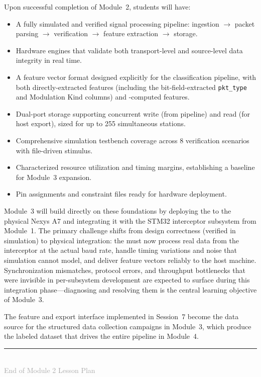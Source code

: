 \documentclass[11pt,letterpaper]{article}
\begin{document}
	Upon successful completion of Module~2, students will have:
	\begin{itemize}[leftmargin=2em]
		\item A fully simulated and verified \FPGA{} signal processing pipeline: \UART{} ingestion $\rightarrow$ packet parsing $\rightarrow$ \CRC{} verification $\rightarrow$ feature extraction $\rightarrow$ \BRAM{} storage.
		\item Hardware \CRC{} engines that validate both transport-level and source-level data integrity in real time.
		\item A feature vector format designed explicitly for the \ML{} classification pipeline, with both directly-extracted features (including the bit-field-extracted \texttt{pkt\_type} and Modulation Kind columns) and \FPGA{}-computed features.
		\item Dual-port \BRAM{} storage supporting concurrent write (from pipeline) and read (for host export), sized for up to 255 simultaneous stations.
		\item Comprehensive simulation testbench coverage across 8 verification scenarios with file-driven stimulus.
		\item Characterized resource utilization and timing margins, establishing a baseline for Module~3 expansion.
		\item Pin assignments and constraint files ready for hardware deployment.
	\end{itemize}

	Module~3 will build directly on these foundations by deploying the \RTL{} to the physical Nexys A7 and integrating it with the STM32 interceptor subsystem from Module~1. The primary challenge shifts from design correctness (verified in simulation) to physical integration: the \FPGA{} must now process real \UART{} data from the interceptor at the actual baud rate, handle timing variations and noise that simulation cannot model, and deliver feature vectors reliably to the host machine. Synchronization mismatches, protocol errors, and throughput bottlenecks that were invisible in per-subsystem development are expected to surface during this integration phase---diagnosing and resolving them is the central learning objective of Module~3.

	The feature \BRAM{} and export interface implemented in Session~7 become the data source for the structured data collection campaigns in Module~3, which produce the labeled \RF{} dataset that drives the entire \ML{} pipeline in Module~4.

	\vfill
	\clearpage
	\printnoidxglossary[type=\acronymtype,title={Glossary}]

	\begin{center}
		\rule{0.5\textwidth}{0.4pt}\\[6pt]
		{\small\textcolor{darkgray}{End of Module 2 Lesson Plan}}
	\end{center}
\end{document}
